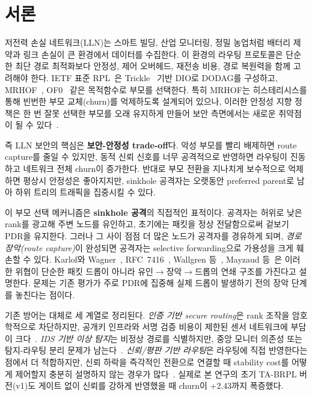 \documentclass[10pt,a4paper,twocolumn]{article}
\begin{document}
\section{서론}
\label{sec:intro}

저전력 손실 네트워크(LLN)는 스마트 빌딩, 산업 모니터링, 정밀 농업처럼
배터리 제약과 링크 손실이 큰 환경에서 데이터를 수집한다.
이 환경의 라우팅 프로토콜은 단순한 최단 경로 최적화보다
안정성, 제어 오버헤드, 재전송 비용, 경로 복원력을 함께 고려해야 한다.
IETF 표준 RPL~\cite{rfc6550}은 Trickle~\cite{rfc6206} 기반 DIO로 DODAG를 구성하고,
MRHOF~\cite{rfc6719}, OF0~\cite{rfc6552} 같은 목적함수로 부모를 선택한다.
특히 MRHOF는 히스테리시스를 통해 빈번한 부모 교체(churn)를 억제하도록 설계되어 있으나,
이러한 안정성 지향 정책은 한 번 잘못 선택한 부모를 오래 유지하게 만들어
보안 측면에서는 새로운 취약점이 될 수 있다~\cite{rfc6551,rpl_stability2015}.

즉 LLN 보안의 핵심은 \textbf{보안-안정성 trade-off}다.
악성 부모를 빨리 배제하면 route capture를 줄일 수 있지만,
동적 신뢰 신호를 너무 공격적으로 반영하면 라우팅이 진동하고
네트워크 전체 churn이 증가한다.
반대로 부모 전환을 지나치게 보수적으로 억제하면 평상시 안정성은 좋아지지만,
sinkhole 공격자는 오랫동안 preferred parent로 남아
하위 트리의 트래픽을 집중시킬 수 있다.

이 부모 선택 메커니즘은 \textbf{sinkhole 공격}의 직접적인 표적이다.
공격자는 허위로 낮은 rank를 광고해 주변 노드를 유인하고,
초기에는 패킷을 정상 전달함으로써 겉보기 PDR을 유지한다.
그러나 그 사이 점점 더 많은 노드가 공격자를 경유하게 되며,
\emph{경로 장악(route capture)}이 완성되면
공격자는 selective forwarding으로
가용성을 크게 훼손할 수 있다.
Karlof와 Wagner~\cite{karlof2003}, RFC~7416~\cite{rfc7416},
Wallgren 등~\cite{secrpl}, Mayzaud 등~\cite{mayzaud2016}은
이러한 위협이 단순한 패킷 드롭이 아니라
유인$\rightarrow$장악$\rightarrow$드롭의 연쇄 구조를 가진다고 설명한다.
문제는 기존 평가가 주로 PDR에 집중해
실제 드롭이 발생하기 전의 장악 단계를 놓친다는 점이다.

기존 방어는 대체로 세 계열로 정리된다.
\emph{인증 기반 secure routing}은 rank 조작을 암호학적으로 차단하지만,
공개키 인프라와 서명 검증 비용이 제한된 센서 네트워크에 부담이 크다~\cite{dvir2011,roll_trust}.
\emph{IDS 기반 이상 탐지}는 비정상 경로를 식별하지만,
중앙 모니터 의존성 또는 탐지-라우팅 분리 문제가 남는다~\cite{raza2013,iotroute_survey2016}.
\emph{신뢰/평판 기반 라우팅}은 라우팅에 직접 반영한다는 점에서 더 적합하지만,
신뢰 하락을 즉각적인 전환으로 연결할 때
stability cost를 어떻게 제어할지 충분히 설명하지 않는 경우가 많다~\cite{sectrust2019,rftrust2021,pccrpl2022,trustmodel2022}.
실제로 본 연구의 초기 TA-BRPL 버전(v1)도 게이트 없이 신뢰를 강하게 반영했을 때
churn이 +2.43까지 폭증했다.
\end{document}
